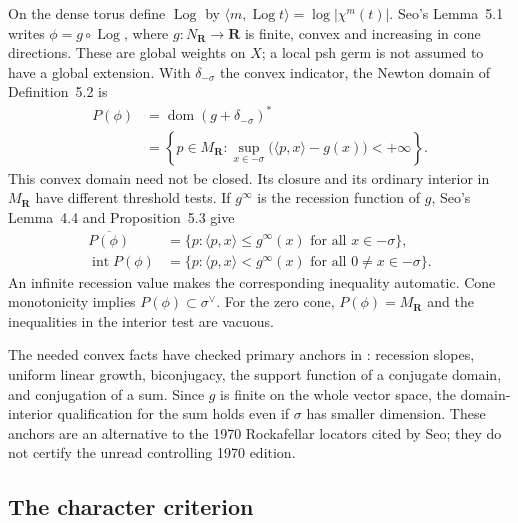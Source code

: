 On the dense torus define $\operatorname{Log}$ by
$\langle m,\operatorname{Log}t\rangle=\log|\chi^m(t)|$.
Seo's Lemma~5.1 writes $\phi=g\circ\operatorname{Log}$, where
$g:N_{\mathbf R}\to\mathbf R$ is finite, convex and increasing in
cone directions. These are global weights on $X$; a local psh germ
is not assumed to have a global extension. With $\delta_{-\sigma}$
the convex indicator, the Newton domain of Definition~5.2 is
\begin{equation*}
\begin{aligned}
 P(\phi)&=\operatorname{dom}(g+\delta_{-\sigma})^*\\
 &=\left\{p\in M_{\mathbf R}:
       \sup_{x\in-\sigma}\bigl(\langle p,x\rangle-g(x)\bigr)<+\infty\right\}.
\end{aligned}
\tag{H.64}\label{eq:appH-toric-Newton-domain}
\end{equation*}
This convex domain need not be closed. Its closure and its ordinary
interior in $M_{\mathbf R}$ have different threshold tests. If
$g^\infty$ is the recession function of $g$, Seo's Lemma~4.4 and
Proposition~5.3 give
\begin{equation*}
\begin{aligned}
 \overline{P(\phi)}
   &=\{p:\langle p,x\rangle\leq g^\infty(x)
                              \text{ for all }x\in-\sigma\},\\
 \operatorname{int}P(\phi)
   &=\{p:\langle p,x\rangle<g^\infty(x)
                              \text{ for all }0\ne x\in-\sigma\}.
\end{aligned}
\tag{H.65}\label{eq:appH-toric-recession-tests}
\end{equation*}
An infinite recession value makes the corresponding inequality
automatic. Cone monotonicity implies $P(\phi)\subset\sigma^\vee$.
For the zero cone, $P(\phi)=M_{\mathbf R}$ and the inequalities in
the interior test are vacuous.

The needed convex facts have checked primary anchors in
\cite[Theorems~3.21, 3.26(a), 11.1, 11.5 and 11.23(a)]{RockafellarWets09Author}:
recession slopes, uniform linear growth, biconjugacy, the support
function of a conjugate domain, and conjugation of a sum. Since $g$
is finite on the whole vector space, the domain-interior qualification
for the sum holds even if $\sigma$ has smaller dimension. These
anchors are an alternative to the 1970 Rockafellar locators cited
by Seo; they do not certify the unread controlling 1970 edition.

\subsection{The character criterion}
\label{sec:appH-toric-character-criterion}

